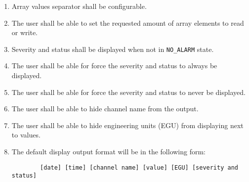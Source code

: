 \documentclass[12pt,a4paper]{article}
\begin{document}
\begin{enumerate}
	\item Array values separator shall be configurable.
	\item The user shall be able to set the requested amount of array elements to read or write.
	\item Severity and status shall be displayed when not in \texttt{NO\_ALARM} state.
	\item The user shall be able for force the severity and status to always be displayed.
	\item The user shall be able for force the severity and status to never be displayed.
	\item The user shall be able to hide channel name from the output.
	\item The user shall be able to hide engineering units (EGU) from displaying next to values.
	\item The default display output format will be in the following form: 
	\begin{verbatim}
		[date] [time] [channel name] [value] [EGU] [severity and status]
	\end{verbatim}
\end{enumerate}

%
%
\end{document}
